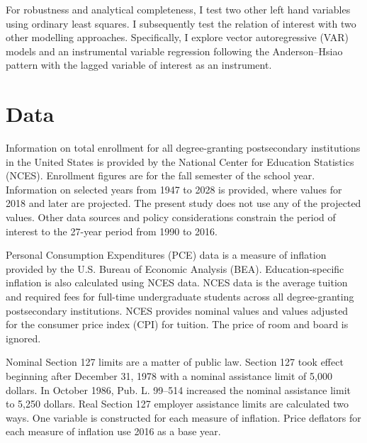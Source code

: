 \documentclass[review]{elsarticle}
\begin{document}
    For robustness and analytical completeness, I test two other left hand variables using ordinary least squares.
    I subsequently test the relation of interest with two other modelling approaches.
    Specifically, I explore vector autoregressive (VAR) models
    and an instrumental variable regression following the Anderson–Hsiao pattern\cite{anderson1981estimation} with the lagged variable of interest as an instrument.

    \section{Data}

    Information on total enrollment for all degree-granting postsecondary institutions in the United States
    is provided by the National Center for Education Statistics (NCES)\cite{nces_2019}.
    Enrollment figures are for the fall semester of the school year.
    Information on selected years from 1947 to 2028 is provided, where values for 2018 and later are projected.
    The present study does not use any of the projected values.
    Other data sources and policy considerations constrain the period of interest to the 27-year period from 1990 to 2016.    

    Personal Consumption Expenditures (PCE) data is a measure of inflation provided by the U.S. Bureau of Economic Analysis (BEA)\cite{bea_2020}.
    Education-specific inflation is also calculated using NCES data\cite{nces_2017}.
    NCES data is the average tuition and required fees for full-time undergraduate students across all degree-granting postsecondary institutions.
    NCES provides nominal values and values adjusted for the consumer price index (CPI) for tuition.
    The price of room and board is ignored.

    Nominal Section 127 limits are a matter of public law.
    Section 127 took effect beginning after December 31, 1978 with a nominal assistance limit of 5,000 dollars\cite{plaw95_600_1978}.
    In October 1986, Pub. L. 99–514 increased the nominal assistance limit to 5,250 dollars\cite{plaw99_514_1986}.
    Real Section 127 employer assistance limits are calculated two ways.
    One variable is constructed for each measure of inflation.
    Price deflators for each measure of inflation use 2016 as a base year.
    
\end{document}

